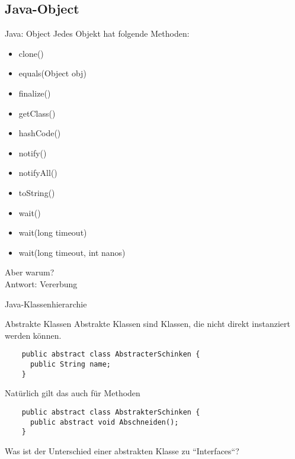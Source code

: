 \documentclass[18pt]{beamer}
\begin{document}
\subsection{Java-Object}
\begin{frame}{Java: Object}
  \small
 Jedes Objekt hat folgende Methoden:
 \begin{itemize}
  \item clone()
  \item equals(Object obj)
  \item finalize()
  \item getClass()
  \item hashCode()
  \item notify()
  \item notifyAll()
  \item toString()
  \item wait()
  \item wait(long timeout)
  \item wait(long timeout, int nanos)
 \end{itemize} \pause
 Aber warum? \pause \\
 \large Antwort: Vererbung
 

\end{frame}
\begin{frame}{Java-Klassenhierarchie}
 
\end{frame}

\begin{frame}[fragile]{Abstrakte Klassen}
 Abstrakte Klassen sind Klassen, die nicht direkt instanziert werden können.
 \begin{lstlisting}
    public abstract class AbstracterSchinken {
      public String name;
    }
 \end{lstlisting} \pause
 Natürlich gilt das auch für Methoden
 \begin{lstlisting}
    public abstract class AbstrakterSchinken {
      public abstract void Abschneiden();
    }
 \end{lstlisting} \pause
Was ist der Unterschied einer abstrakten Klasse zu ``Interfaces``?
\end{frame}
\end{document}
